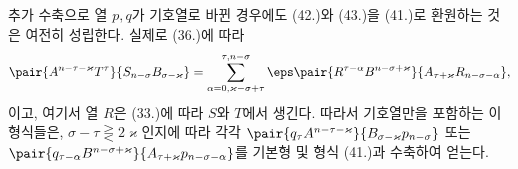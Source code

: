 
추가 수축으로 열 $p,q$가 기호열로 바뀐 경우에도 (42.)와 (43.)을 (41.)로 환원하는 것은 여전히 성립한다. 실제로 (36.)에 따라
\[
 \pair{A^{n-\tau-\varkappa}T^\tau}{S_{n-\sigma}B_{\sigma-\varkappa}}
 =\sum_{\alpha=0,\varkappa-\sigma+\tau}^{\tau,n-\sigma}
 \eps\pair{R^{\tau-\alpha}B^{n-\sigma+\varkappa}}{A_{\tau+\varkappa}R_{n-\sigma-\alpha}},
\]
이고, 여기서 열 $R$은 (33.)에 따라 $S$와 $T$에서 생긴다. 따라서 기호열만을 포함하는 이 형식들은, $\sigma-\tau\gtreqless 2\varkappa$인지에 따라 각각 $\pair{q_\tau A^{n-\tau-\varkappa}}{B_{\sigma-\varkappa}p_{n-\sigma}}$ 또는 $\pair{q_{\tau-\alpha}B^{n-\sigma+\varkappa}}{A_{\tau+\varkappa}p_{n-\sigma-\alpha}}$를 기본형 및 형식 (41.)과 수축하여 얻는다.
